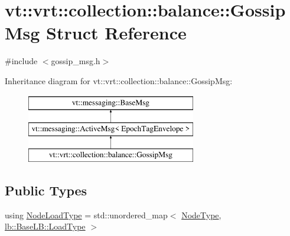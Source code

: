 \hypertarget{structvt_1_1vrt_1_1collection_1_1balance_1_1_gossip_msg}{}\section{vt\+:\+:vrt\+:\+:collection\+:\+:balance\+:\+:Gossip\+Msg Struct Reference}
\label{structvt_1_1vrt_1_1collection_1_1balance_1_1_gossip_msg}


{\ttfamily \#include $<$gossip\+\_\+msg.\+h$>$}

Inheritance diagram for vt\+:\+:vrt\+:\+:collection\+:\+:balance\+:\+:Gossip\+Msg\+:\begin{figure}[H]
\begin{center}
\leavevmode
\includegraphics[height=3.000000cm]{structvt_1_1vrt_1_1collection_1_1balance_1_1_gossip_msg}
\end{center}
\end{figure}
\subsection*{Public Types}
\begin{DoxyCompactItemize}
\item 
using \hyperlink{structvt_1_1vrt_1_1collection_1_1balance_1_1_gossip_msg_a8deef056cb137cfd67540a31be189122}{Node\+Load\+Type} = std\+::unordered\+\_\+map$<$ \hyperlink{namespacevt_a866da9d0efc19c0a1ce79e9e492f47e2}{Node\+Type}, \hyperlink{structvt_1_1vrt_1_1collection_1_1lb_1_1_base_l_b_a215e22b9f12678303f49615ae3be05cc}{lb\+::\+Base\+L\+B\+::\+Load\+Type} $>$
\end{DoxyCompactItemize}
